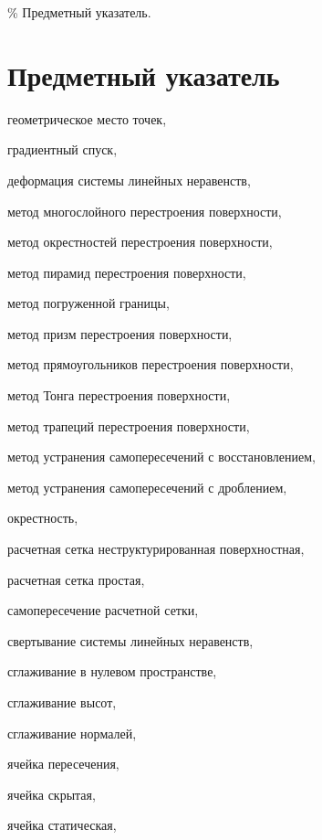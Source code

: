 \% Предметный указатель.
\newpage

\section*{Предметный указатель}

геометрическое место точек, \pageref{term:gmt}

градиентный спуск, \pageref{term:gradient_spusk}

деформация системы линейных неравенств, \pageref{term:deform_sys_lin_neravenstv}

метод многослойного перестроения поверхности, \pageref{term:method_remesh_multi}

метод окрестностей перестроения поверхности, \pageref{term:method_remesh_okr}

метод пирамид перестроения поверхности, \pageref{term:method_remesh_pyramid}

метод погруженной границы, \pageref{term:immersed_boundary_method}

метод призм перестроения поверхности, \pageref{term:method_remesh_prism}

метод прямоугольников перестроения поверхности, \pageref{term:method_remesh_rect}

метод Тонга перестроения поверхности, \pageref{term:method_remesh_tong}

метод трапеций перестроения поверхности, \pageref{term:method_remesh_trap}

метод устранения самопересечений с восстановлением, \pageref{term:method_selfint_repare}

метод устранения самопересечений с дроблением, \pageref{term:method_selfint_cut}

окрестность, \pageref{term:okrestnost}

расчетная сетка неструктурированная поверхностная, \pageref{term:unstruct_surf_calc_mesh}

расчетная сетка простая, \pageref{term:mesh_simple}

самопересечение расчетной сетки, \pageref{term:mesh_self_intersect}

свертывание системы линейных неравенств, \pageref{term:method_svert_sys_neravenstv}

сглаживание в нулевом пространстве, \pageref{term:smooth_null}

сглаживание высот, \pageref{term:smooth_height}

сглаживание нормалей, \pageref{term:smooth_norm}

ячейка пересечения, \pageref{term:cell_intersect}

ячейка скрытая, \pageref{term:cell_hidden}

ячейка статическая, \pageref{term:cell_static}
